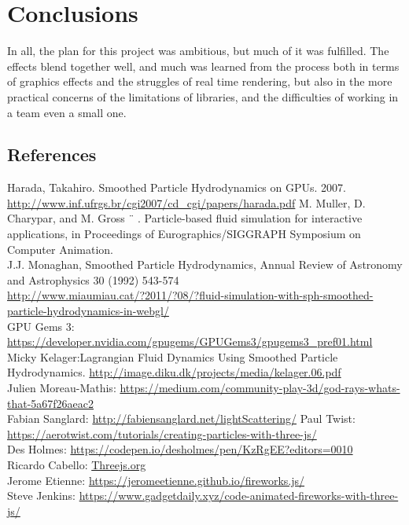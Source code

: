 \section{Conclusions}
In all, the plan for this project was ambitious, but much of it was fulfilled. 
The effects blend together well, and much was learned from the process both in terms
of graphics effects and the struggles of real time rendering, but also in the more practical concerns
of the limitations of libraries, and the difficulties of working in a team even a small one. 

\subsection{References}
Harada, Takahiro. Smoothed Particle Hydrodynamics on GPUs. 2007. \url{http://www.inf.ufrgs.br/cgi2007/cd_cgi/papers/harada.pdf}
M. Muller, D. Charypar, and M. Gross ¨ . Particle-based fluid simulation
for interactive applications, in Proceedings of Eurographics/SIGGRAPH
Symposium on Computer Animation. \\
J.J. Monaghan, Smoothed Particle Hydrodynamics, Annual Review of Astronomy and Astrophysics
30 (1992) 543-574 \\
\url{http://www.miaumiau.cat/?2011/?08/?fluid-simulation-with-sph-smoothed-particle-hydrodynamics-in-webgl/} \\
GPU Gems 3: \url{https://developer.nvidia.com/gpugems/GPUGems3/gpugems3_pref01.html} \\
Micky Kelager:Lagrangian Fluid Dynamics
Using Smoothed Particle Hydrodynamics. \url{http://image.diku.dk/projects/media/kelager.06.pdf} \\
Julien Moreau-Mathis: \url{https://medium.com/community-play-3d/god-rays-whats-that-5a67f26aeac2} \\
Fabian Sanglard: \url{http://fabiensanglard.net/lightScattering/}
Paul Twist: \url{https://aerotwist.com/tutorials/creating-particles-with-three-js/}\\

Des Holmes: \url{https://codepen.io/desholmes/pen/KzRgEE?editors=0010}\\

Ricardo Cabello: \url{Threejs.org}\\

Jerome Etienne: \url{https://jeromeetienne.github.io/fireworks.js/}\\

Steve Jenkins: \url{https://www.gadgetdaily.xyz/code-animated-fireworks-with-three-js/}\\

